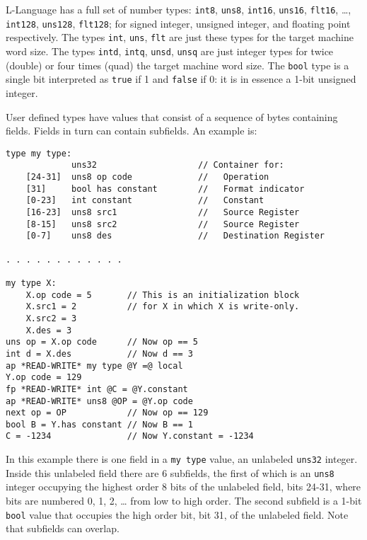 \documentclass[12pt]{article}
\newenvironment{indpar}[1][0.3in]%
	{\begin{list}{}%
		     {\setlength{\itemsep}{0in}%
		      \setlength{\topsep}{0in}%
		      \setlength{\parsep}{1ex}%
		      \setlength{\labelwidth}{#1}%
		      \setlength{\leftmargin}{#1}%
		      \addtolength{\leftmargin}{\labelsep}}%
	 \item}%
	{\end{list}}
\begin{document}
L-Language has a full set of number types:
{\tt int8}, {\tt uns8},
{\tt int16}, {\tt uns16}, {\tt flt16}, \ldots,
{\tt int128}, {\tt uns128}, {\tt flt128}; for signed integer,
unsigned integer, and floating point respectively.
The types {\tt int}, {\tt uns}, {\tt flt} are just these
types for the target machine word size.
The types {\tt intd}, {\tt intq}, {\tt unsd}, {\tt unsq} are just integer
types for twice (double) or four times (quad) the target machine word size.
The {\tt bool} type is a single bit interpreted as {\tt true} if
1 and {\tt false} if 0: it is in essence a 1-bit unsigned integer.

User defined types have values that
consist of a sequence of bytes containing fields.
Fields in turn can contain subfields.
An example is:

\begin{indpar}\begin{verbatim}
type my type:
             uns32                    // Container for:
    [24-31]  uns8 op code             //   Operation
    [31]     bool has constant        //   Format indicator
    [0-23]   int constant             //   Constant
    [16-23]  uns8 src1                //   Source Register
    [8-15]   uns8 src2                //   Source Register
    [0-7]    uns8 des                 //   Destination Register

. . . . . . . . . . . .

my type X:
    X.op code = 5       // This is an initialization block
    X.src1 = 2          // for X in which X is write-only.
    X.src2 = 3
    X.des = 3
uns op = X.op code      // Now op == 5
int d = X.des           // Now d == 3
ap *READ-WRITE* my type @Y =@ local
Y.op code = 129
fp *READ-WRITE* int @C = @Y.constant
ap *READ-WRITE* uns8 @OP = @Y.op code
next op = OP            // Now op == 129
bool B = Y.has constant // Now B == 1
C = -1234               // Now Y.constant = -1234
\end{verbatim}\end{indpar}

In this example there is one field in a {\tt my type} value,
an unlabeled {\tt uns32} integer.
Inside this unlabeled field there are 6 subfields, the first of which is
an {\tt uns8} integer occupying the highest order 8
bits of the unlabeled field, bits 24-31,
where bits are numbered 0, 1, 2, \ldots{} from
low to high order.  The second subfield is a 1-bit {\tt bool}
value that occupies the high order bit, bit 31, of the unlabeled field.
Note that subfields can overlap.
\end{document}
